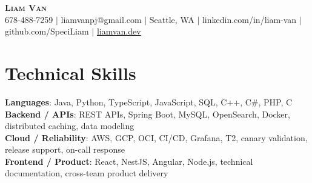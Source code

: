 \documentclass[letterpaper,11pt]{article}
\begin{document}

%
\begin{center}
    \textbf{\Huge \scshape Liam Van} \\ \vspace{1pt}
    \small 678-488-7259 $|$ \small {liamvanpj@gmail.com} $|$ Seattle, WA
 {{$|$ linkedin.com/in/liam-van} {$|$ github.com/SpeciLiam} {$|$ \href{https://liamvan.dev}{liamvan.dev}}}

\end{center}

\section{Technical Skills}
 \begin{itemize}[leftmargin=0.15in, label={}]
    \small{\item{
     \textbf{Languages}{: Java, Python, TypeScript, JavaScript, SQL, C++, C\#, PHP, C} \\
     \textbf{Backend / APIs}{: REST APIs, Spring Boot, MySQL, OpenSearch, Docker, distributed caching, data modeling} \\
     \textbf{Cloud / Reliability}{: AWS, GCP, OCI, CI/CD, Grafana, T2, canary validation, release support, on-call response} \\
     \textbf{Frontend / Product}{: React, NestJS, Angular, Node.js, technical documentation, cross-team product delivery} \\
    }}
 \end{itemize}
%

\end{document}

